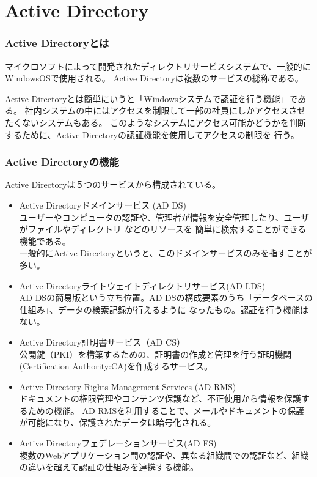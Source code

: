 \documentclass[11pt,a4j,titlepage]{jreport}
\begin{document}
\section{Active Directory}\label{Active Directory}
\subsubsection*{Active Directoryとは}
マイクロソフトによって開発されたディレクトリサービスシステムで、一般的にWindowsOSで使用される。
Active Directoryは複数のサービスの総称である。


Active Directoryとは簡単にいうと「Windowsシステムで認証を行う機能」である。
社内システムの中にはアクセスを制限して一部の社員にしかアクセスさせたくないシステムもある。
このようなシステムにアクセス可能かどうかを判断するために、Active Directoryの認証機能を使用してアクセスの制限を
行う。

\subsubsection*{Active Directoryの機能}

Active Directoryは５つのサービスから構成されている。

\begin{itemize}
    \item  Active Directoryドメインサービス (AD DS)\mbox{}\\
    ユーザーやコンピュータの認証や、管理者が情報を安全管理したり、ユーザがファイルやディレクトリ などのリソースを
    簡単に検索することができる機能である。\\
    一般的にActive Directoryというと、このドメインサービスのみを指すことが多い。
    
    \item Active Directoryライトウェイトディレクトリサービス(AD LDS)\mbox{}\\
    AD DSの簡易版という立ち位置。AD DSの構成要素のうち「データベースの仕組み」、データの検索記録が行えるように
    なったもの。認証を行う機能はない。

    \item Active Directory証明書サービス（AD CS）\mbox{}\\
    公開鍵（PKI）を構築するための、証明書の作成と管理を行う証明機関(Certification Authority:CA)を作成するサービス。
    
    \item Active Directory Rights Management Services (AD RMS)\mbox{}\\
    ドキュメントの権限管理やコンテンツ保護など、不正使用から情報を保護するための機能。
    AD RMSを利用することで、メールやドキュメントの保護が可能になり、保護されたデータは暗号化される。

    \item Active Directoryフェデレーションサービス(AD FS)\mbox{}\\
    複数のWebアプリケーション間の認証や、異なる組織間での認証など、組織の違いを超えて認証の仕組みを連携する機能。

\end{itemize}
\end{document}
